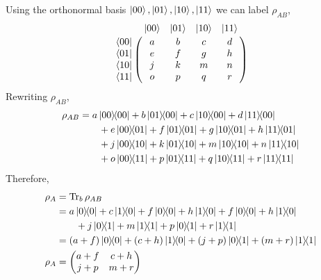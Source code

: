 Using the orthonormal basis $\ket{00}, \ket{01}, \ket{10}, \ket{11}$ we can label $\rho_{AB}$,
\begin{equation}
    \bordermatrix{ & \ket{00} & \ket{01} & \ket{10} & \ket{11}\cr
      \bra{00} & a & b & c & d \cr
      \bra{01} & e & f & g & h \cr
      \bra{10} & j & k & m & n \cr
      \bra{11} & o & p & q & r }
\end{equation}
Rewriting $\rho_{AB}$,
\begin{align}
    \rho_{AB} &= a \ketbra{00}{00} + b \ketbra{01}{00} + c \ketbra{10}{00} + d \ketbra{11}{00}  \notag \\
    &\qquad + e \ketbra{00}{01} + f \ketbra{01}{01} + g \ketbra{10}{01} + h \ketbra{11}{01} \notag \\
    &\qquad + j \ketbra{00}{10} + k \ketbra{01}{10} + m \ketbra{10}{10} + n \ketbra{11}{10} \notag \\
    &\qquad + o \ketbra{00}{11} + p \ketbra{01}{11} + q \ketbra{10}{11} + r \ketbra{11}{11} 
\end{align}
Therefore,
\begin{align}
    \rho_A &= \Tr_b \rho_{AB} \\
    &= a\ketbra{0}{0} + c \ketbra{1}{0} + f\ketbra{0}{0} + h\ketbra{1}{0} + f\ketbra{0}{0} + h\ketbra{1}{0}\\
    & \qquad + j\ketbra{0}{1} + m \ketbra{1}{1} + p \ketbra{0}{1} + r \ketbra{1}{1} \\
    &= (a + f)\ketbra{0}{0} + (c + h)\ketbra{1}{0} + (j+p)\ketbra{0}{1} + (m+r)\ketbra{1}{1} \\
    \rho_A &= \begin{pmatrix}a + f & c + h \\ j + p & m + r\end{pmatrix}
\end{align}



\newpage
